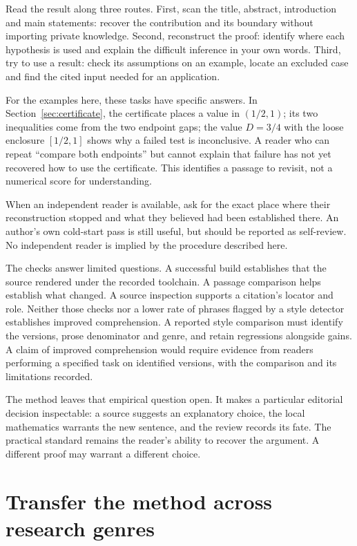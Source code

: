 Read the result along three routes. First, scan the title, abstract,
introduction and main statements: recover the contribution and its boundary
without importing private knowledge. Second, reconstruct the proof: identify
where each hypothesis is used and explain the difficult inference in your own
words. Third, try to use a result: check its assumptions on an example, locate
an excluded case and find the cited input needed for an application.

For the examples here, these tasks have specific answers. In
Section~\ref{sec:certificate}, the certificate places a value in $(1/2,1)$;
its two inequalities come from the two endpoint gaps; the value $D=3/4$ with
the loose enclosure $[1/2,1]$ shows why a failed test is inconclusive. A reader
who can repeat ``compare both endpoints'' but cannot explain that failure has
not yet recovered how to use the certificate. This identifies a passage to
revisit, not a numerical score for understanding.

When an independent reader is available, ask for the exact place where their
reconstruction stopped and what they believed had been established there.
An author's own cold-start pass is still useful, but should be reported as
self-review. No independent reader is implied by the procedure described here.

The checks answer limited questions. A successful build establishes that the
source rendered under the recorded toolchain. A passage comparison helps
establish what changed. A source inspection supports a citation's locator
and role. Neither those checks nor a lower rate of phrases flagged by a style
detector establishes improved comprehension. A reported style comparison must
identify the versions, prose denominator and genre, and retain regressions
alongside gains. A claim of improved comprehension would require evidence
from readers performing a specified task on identified versions, with the
comparison and its limitations recorded.

The method leaves that empirical question open. It makes a particular editorial
decision inspectable: a source suggests an explanatory choice, the local
mathematics warrants the new sentence, and the review records its fate. The
practical standard remains the reader's ability to recover the argument. A
different proof may warrant a different choice.


\section{Transfer the method across research genres}\label{sec:genre-transfer}

